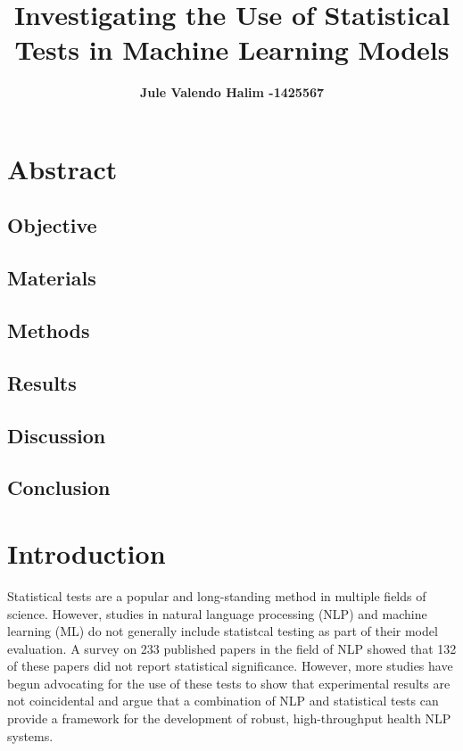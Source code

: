 \documentclass[10.7pt, twocolumn]{article}
\title{\vspace{-2em} Investigating the Use of Statistical Tests in Machine Learning Models}
\author[ ]{\bf\fontsize{13}{14}\selectfont Jule Valendo Halim -1425567\vspace{-.7em}}
\affil[ ]{\bf\fontsize{13}{14}\selectfont University of Melbourne}
\date{} %
\begin{document}
\maketitle
\vspace{-4em} %

\section{Abstract}\label{abstract}
\subsection{Objective}

\subsection{Materials}

\subsection{Methods}

\subsection{Results}

\subsection{Discussion}

\subsection{Conclusion}

\section{Introduction}\label{introduction}
Statistical tests are a popular and long-standing method in multiple fields of science. However, studies in natural language processing (NLP) and machine learning (ML) do not generally include statistcal testing as part of their model evaluation. A survey on 233 published papers in the field of NLP showed that 132 of these papers did not report statistical significance\cite{statsPaper}. However, more studies have begun advocating for the use of these tests to show that experimental results are not coincidental\cite{statsPaper} and argue that a combination of NLP and statistical tests can provide a framework for the development of robust, high-throughput health NLP systems\cite{10.1197/jamia.M3028}. 
\end{document}
